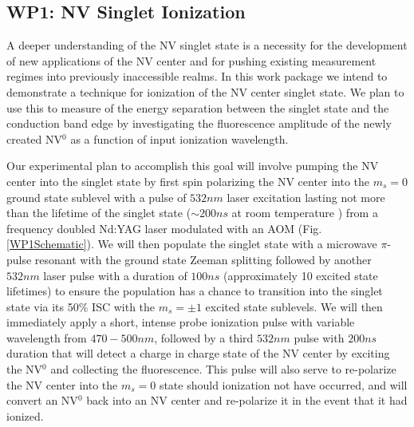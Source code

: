 \subsection{WP1: NV Singlet Ionization}
A deeper understanding of the NV singlet state is a necessity for the development of new applications of the NV
center and for pushing existing measurement regimes into previously inaccessible realms.  In this work package we
intend to demonstrate a technique for ionization of the NV center singlet state.  We plan to use this to measure of the energy separation between the singlet state and the conduction band edge by investigating the fluorescence amplitude of the newly created NV$^0$ as a function of input ionization wavelength.

Our experimental plan to accomplish this goal will involve pumping the NV center into the singlet state by first spin
polarizing the NV center into the $m_s = 0$ ground state sublevel with a pulse of $532\unit{nm}$ laser
excitation
lasting not more than the lifetime of the singlet state ($\sim200\unit{ns}$ at room temperature
\cite{Dreau2011}) from a frequency
doubled Nd:YAG laser modulated with an AOM (Fig. \ref{WP1Schematic}).  We will then populate the singlet
state with a microwave
$\pi$-pulse resonant with the ground state Zeeman splitting followed by another $532\unit{nm}$ laser
pulse with a duration of
$100\unit{ns}$ (approximately 10 excited state lifetimes) to ensure the population has a chance to
transition into the
singlet state via its 50\% ISC with the $m_s = \pm1$ excited state sublevels.  We will then immediately apply a
short, intense
probe ionization pulse with variable wavelength from $470-500\unit{nm}$, followed by a third $532\unit{nm}$ pulse with
$200\unit{ns}$ duration that
will detect a charge in charge state of the NV center by 
exciting the NV$^0$ and collecting the fluorescence.  This pulse will also serve to re-polarize the NV center into the $m_s = 0$ state should
ionization
not have occurred, and will convert an NV$^0$ back into an NV center and re-polarize it in the event
that it had ionized.

